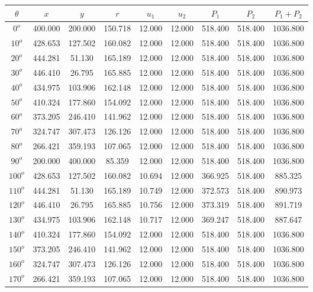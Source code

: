     \singlespacing
    \begin{table}[H]
        \centering
        \begin{tabular}{|c|c|c|c|c|c|c|c|c|} \hline
    $\theta$ &$x$ &$y$ &$r$ &$u_1$ &$u_2$ &$P_1$ &$P_2$ &$P_1+P_2$ \\ \hline
$0^o$	&400.000	&200.000	&150.718	&12.000	&12.000	&518.400	&518.400	&1036.800 \\ \hline
$10^o$	&428.653	&127.502	&160.082	&12.000	&12.000	&518.400	&518.400	&1036.800 \\ \hline
$20^o$	&444.281	&51.130	&165.189	&12.000	&12.000	&518.400	&518.400	&1036.800 \\ \hline
$30^o$	&446.410	&26.795	&165.885	&12.000	&12.000	&518.400	&518.400	&1036.800 \\ \hline
$40^o$	&434.975	&103.906	&162.148	&12.000	&12.000	&518.400	&518.400	&1036.800 \\ \hline
$50^o$	&410.324	&177.860	&154.092	&12.000	&12.000	&518.400	&518.400	&1036.800 \\ \hline
$60^o$	&373.205	&246.410	&141.962	&12.000	&12.000	&518.400	&518.400	&1036.800 \\ \hline
$70^o$	&324.747	&307.473	&126.126	&12.000	&12.000	&518.400	&518.400	&1036.800 \\ \hline
$80^o$	&266.421	&359.193	&107.065	&12.000	&12.000	&518.400	&518.400	&1036.800 \\ \hline
$90^o$	&200.000	&400.000	&85.359	&12.000	&12.000	&518.400	&518.400	&1036.800 \\ \hline
$100^o$	&428.653	&127.502	&160.082	&10.694	&12.000	&366.925	&518.400	&885.325 \\ \hline
$110^o$	&444.281	&51.130	&165.189	&10.749	&12.000	&372.573	&518.400	&890.973 \\ \hline
$120^o$	&446.410	&26.795	&165.885	&10.756	&12.000	&373.319	&518.400	&891.719 \\ \hline
$130^o$	&434.975	&103.906	&162.148	&10.717	&12.000	&369.247	&518.400	&887.647 \\ \hline
$140^o$	&410.324	&177.860	&154.092	&12.000	&12.000	&518.400	&518.400	&1036.800 \\ \hline
$150^o$	&373.205	&246.410	&141.962	&12.000	&12.000	&518.400	&518.400	&1036.800 \\ \hline
$160^o$	&324.747	&307.473	&126.126	&12.000	&12.000	&518.400	&518.400	&1036.800 \\ \hline
$170^o$	&266.421	&359.193	&107.065	&12.000	&12.000	&518.400	&518.400	&1036.800 \\ \hline

\end{tabular}
\end{table}
